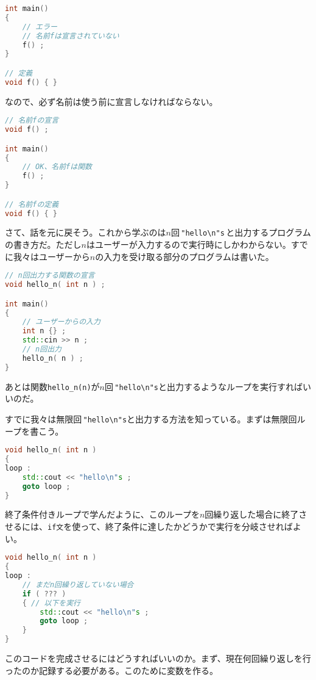 \begin{lstlisting}[language={C++}]
int main()
{
    // エラー
    // 名前fは宣言されていない
    f() ;
}

// 定義
void f() { }
\end{lstlisting}

なので、必ず名前は使う前に宣言しなければならない。

\begin{lstlisting}[language={C++}]
// 名前fの宣言
void f() ;

int main()
{
    // OK、名前fは関数
    f() ;
}

// 名前fの定義
void f() { }
\end{lstlisting}

さて、話を元に戻そう。これから学ぶのは\(n\)回\,\texttt{"hello{\textbackslash}n"s}\,と出力するプログラムの書き方だ。ただし\(n\)はユーザーが入力するので実行時にしかわからない。すでに我々はユーザーから\(n\)の入力を受け取る部分のプログラムは書いた。

\begin{lstlisting}[language={C++}]
// n回出力する関数の宣言
void hello_n( int n ) ;

int main()
{
    // ユーザーからの入力
    int n {} ;
    std::cin >> n ;
    // n回出力
    hello_n( n ) ;
}
\end{lstlisting}

あとは関数\texttt{hello\_n(n)}が\(n\)回\,\texttt{"hello{\textbackslash}n"s}と出力するようなループを実行すればいいのだ。

すでに我々は無限回\,\texttt{"hello{\textbackslash}n"s}と出力する方法を知っている。まずは無限回ループを書こう。

\begin{lstlisting}[language={C++}]
void hello_n( int n )
{
loop :
    std::cout << "hello\n"s ;
    goto loop ;
}
\end{lstlisting}

終了条件付きループで学んだように、このループを\(n\)回繰り返した場合に終了させるには、\texttt{if文}を使って、終了条件に達したかどうかで実行を分岐させればよい。

\ifTombow\pagebreak\fi
\begin{lstlisting}[language={C++}]
void hello_n( int n )
{
loop :
    // まだn回繰り返していない場合
    if ( ??? )
    { // 以下を実行
        std::cout << "hello\n"s ;
        goto loop ;
    }
}
\end{lstlisting}

このコードを完成させるにはどうすればいいのか。まず、現在何回繰り返しを行ったのか記録する必要がある。このために変数を作る。

